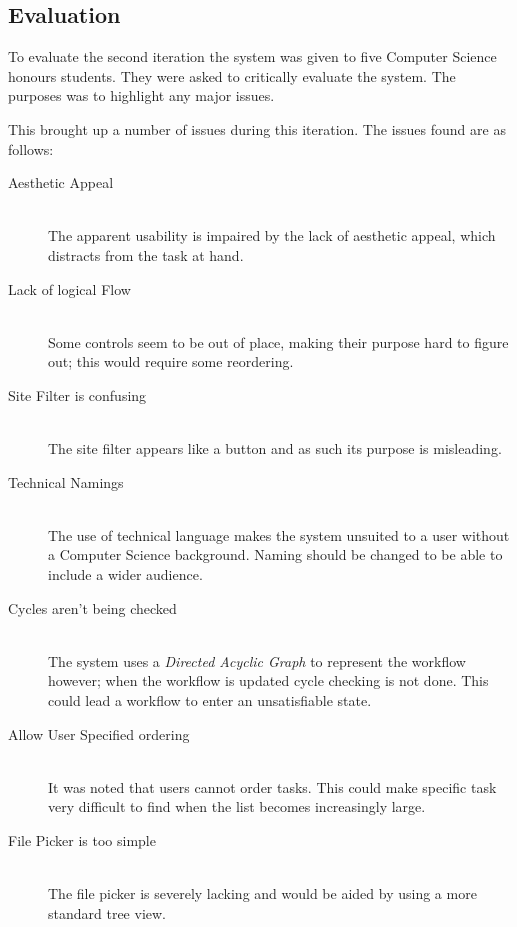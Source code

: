 \documentclass[12pt,a4paper]{report}
\begin{document}
\subsection{Evaluation}
To evaluate the second iteration the system was given to five Computer Science honours students.
They were asked to critically evaluate the system. The purposes was to highlight any major
issues.

This brought up a number of issues during this iteration. The issues found are
as follows:
\begin{description}
    \item[Aesthetic Appeal]\hfill \\
    	The apparent usability is impaired by the lack of aesthetic appeal, which distracts
        from the  task at hand\cite{Tractinsky:1997:AAU:258549.258626}.
    \item[Lack of logical Flow]\hfill \\
        Some controls seem to be out of place, making their purpose hard to
	figure out; this would require some reordering.
    \item[Site Filter is confusing] \hfill \\
        The site filter appears like a button and as such its purpose is misleading.
    \item[Technical Namings] \hfill \\
        The use of technical language makes the system unsuited to a user without
        a Computer Science background. Naming should be changed to be able to include
        a wider audience.
    \item[Cycles aren't being checked] \hfill \\
        The system uses a \emph{Directed Acyclic Graph} to represent the
	workflow however; when the workflow is updated cycle checking is not done. 
	This could lead a workflow to enter an   unsatisfiable state.
    \item[Allow User Specified ordering] \hfill\\
        It was noted that users cannot order tasks. This could make specific
	task very difficult to find when the list becomes increasingly large.
    \item[File Picker is too simple] \hfill \\
        The file picker is severely lacking and would be aided by using a more standard
        tree view.
\end{description}
\end{document}
